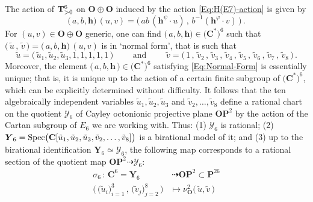 \documentclass[11pt]{amsart}
\begin{document}
 The action of ${\bf T}_{>0}^6$ on $\mathbf O\oplus \mathbf O$ induced by the action \eqref{Eq:H(E7)-action} is given by 
 $$ 
 \big(\, a, b ,\boldsymbol{h}\big)\, (u,v)= \Big( \, ab \,(\boldsymbol{h}^\psi\cdot  u) \, , \, b^{-1} (\boldsymbol{h}^\varphi\cdot v)\, \Big) \, . 
 $$
 For $(u,v)\in \mathbf O\oplus \mathbf O$ generic, one can find $\big(\, a, b ,\boldsymbol{h}\big)\in\big( \mathbf C^*\big)^6$ such that 
$\big(\,  \tilde u\, , \, \tilde v\,\big)=
 \big(\, a, b , \boldsymbol{h}\big)\,(u,v)$ 
 is in `normal form', that is such that 
\begin{equation} %
\label{Eq:Normal-Form} %
 \tilde u=\big(\, \tilde u_1 , \tilde u_2 , \tilde u_3 ,  1, 1 , 1 ,1, 1\,  \big) \qquad \mbox{ and }
 \qquad \tilde v=\big(\, 1 \, , \, \tilde v_2 \, , \,  
 \tilde v_3 \, , \,  
 \tilde v_4 \, , \,  
 \tilde v_5 \, , \,  
 \tilde v_6 \, , \,  
 \tilde v_7 \, , \,  
  \tilde v_8\,  \big)\, .
 \end{equation} %
 Moreover, the element $\big(\, a , b ,\boldsymbol{h}\,\big)
 \in\big( \mathbf C^*\big)^6$ satisfying \eqref{Eq:Normal-Form} is essentially unique; that is, it is unique up to the action of a certain finite subgroup of $\big( \mathbf C^*\big)^6$, which can be explicitly determined without difficulty.
It follows that the ten algebraically independent variables $\tilde u_1 , \tilde u_2 , \tilde u_3$ and 
$\tilde v_2 , \ldots , \tilde v_8 $ define a rational chart on the quotient $\boldsymbol{\mathcal Y}_6$ of Cayley octonionic projective plane $\mathbf O\mathbf P^2$ by the action of the Cartan subgroup of $E_6$ we are working with. 
 Thus:  (1) $\boldsymbol{\mathcal Y}_6$ is rational;  (2) 
  $\boldsymbol{Y}_6={\rm Spec}\big( 
 \mathbf C[\tilde u_1 , \tilde u_2 , \tilde u_3, 
 \tilde v_2 , \ldots , \tilde v_8 ]
 \big)$ is a birational model of it; and (3) up to the birational identification 
$\boldsymbol{Y}_6\simeq  \boldsymbol{\mathcal Y}_6$,   the following map corresponds to a  rational section of the quotient map $\mathbf O\mathbf P^2\dashrightarrow \boldsymbol{\mathcal Y}_6$: 
\begin{align} %
\label{Eq:rational-section-r=6} %
\sigma_6\, :\, \mathbf C^6= \boldsymbol{Y}_6 & \, \dashrightarrow \mathbf O\mathbf P^2 \subset \mathbf P^{26}\\
 \Big(\,\big(\tilde u_i\big)_{i=1}^3 \, , \, 
\big(\tilde v_j\big)_{j=2}^8 \, \Big)
 & \longmapsto \nu_{\mathbf O}^2\big(\,\tilde u, 
 \tilde v\, \big)
 \nonumber 
\end{align}%
\end{document}
